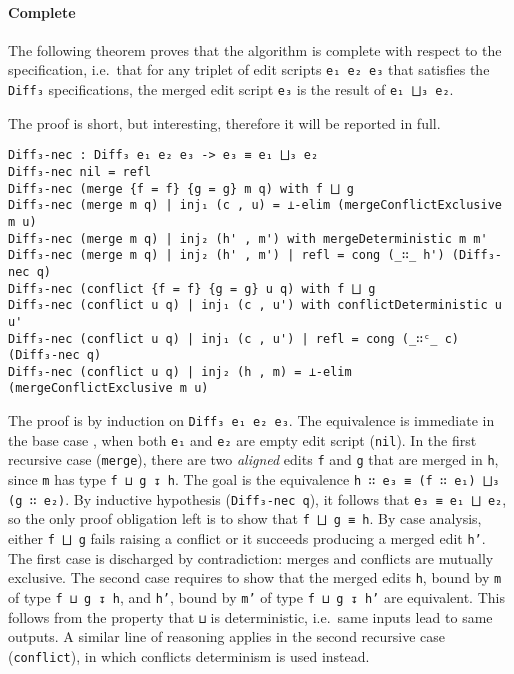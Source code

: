 \documentclass[../Thesis.tex]{subfiles}
\begin{document}
	\paragraph{Complete}
	The following theorem proves that the algorithm is
	complete with respect to the specification, i.e.\ that
	for any triplet of edit scripts \texttt{e₁ e₂ e₃} that satisfies 
	the \texttt{Diff₃} specifications, the merged
	edit script \texttt{e₃} is the result of \texttt{e₁ ⨆₃ e₂}.
	
	The proof is short, but interesting, therefore it will
	be reported in full.
	
\begin{verbatim}
Diff₃-nec : Diff₃ e₁ e₂ e₃ -> e₃ ≡ e₁ ⨆₃ e₂
Diff₃-nec nil = refl
Diff₃-nec (merge {f = f} {g = g} m q) with f ⨆ g
Diff₃-nec (merge m q) | inj₁ (c , u) = ⊥-elim (mergeConflictExclusive m u)
Diff₃-nec (merge m q) | inj₂ (h' , m') with mergeDeterministic m m'
Diff₃-nec (merge m q) | inj₂ (h' , m') | refl = cong (_∷_ h') (Diff₃-nec q)
Diff₃-nec (conflict {f = f} {g = g} u q) with f ⨆ g
Diff₃-nec (conflict u q) | inj₁ (c , u') with conflictDeterministic u u'
Diff₃-nec (conflict u q) | inj₁ (c , u') | refl = cong (_∷ᶜ_ c) (Diff₃-nec q)
Diff₃-nec (conflict u q) | inj₂ (h , m) = ⊥-elim (mergeConflictExclusive m u)	
\end{verbatim}

	The proof is by induction on \texttt{Diff₃ e₁ e₂ e₃}.
	The equivalence is immediate in the base case	, when both
	\texttt{e₁} and \texttt{e₂} are empty edit script (\texttt{nil}).
	In the first recursive case (\texttt{merge}), there are 
	two \emph{aligned} edits \texttt{f} and \texttt{g} that are
	merged in \texttt{h}, since \texttt{m} has type \texttt{f ⊔ g ↧ h}.
	The goal is the equivalence \texttt{h ∷ e₃ ≡ (f ∷ e₁) ⨆₃ (g ∷ e₂)}. By inductive 
	hypothesis (\texttt{Diff₃-nec q}), it follows that \texttt{e₃ ≡ e₁ ⨆ e₂}, so
	the only proof obligation left is to show that \texttt{f ⨆ g ≡ h}.
	By case analysis, either \texttt{f ⨆ g} fails raising a conflict or it succeeds
	producing a merged edit \texttt{h'}.
	The first case is discharged by contradiction: merges and conflicts
	are mutually exclusive.
	The second case requires to show that the merged edits \texttt{h},
	bound by \texttt{m} of type \texttt{f ⊔ g ↧ h}, and \texttt{h'}, bound by 
	\texttt{m'} of type \texttt{f ⊔ g ↧ h'} are equivalent.
	This follows from the property that \texttt{⊔} is deterministic, 
	i.e.\ same inputs lead to same outputs.
	A similar line of reasoning applies in the second recursive
	case (\texttt{conflict}), in which conflicts determinism
	is used instead.
	
\end{document}
